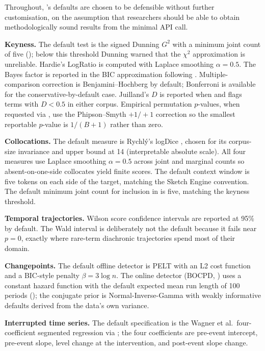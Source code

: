 \documentclass[codesnippet]{jss}
\newcommand{\fct}[1]{\code{#1()}}
\begin{document}
Throughout, 's defaults are chosen to be
defensible without further customisation, on the assumption that
researchers should be able to obtain methodologically sound
results from the minimal API call.

\textbf{Keyness.} The default test is the signed Dunning $G^2$
\citep{dunning1993} with a minimum joint count of five
(); below this threshold Dunning warned that
the $\chi^2$ approximation is unreliable. Hardie's LogRatio
\citep{hardie2014logratio} is computed with Laplace smoothing
$\alpha = 0.5$. The Bayes factor is reported in the BIC
approximation following \citet{wilson2013}. Multiple-comparison
correction is Benjamini--Hochberg \citep{benjamini1995fdr} by
default; Bonferroni is available for the conservative-by-default
case. Juilland's $D$ \citep{juilland1964} is reported when
 and flags terms with $D < 0.5$ in either
corpus. Empirical permutation $p$-values, when requested via
, use the Phipson--Smyth
\citep{phipson2010permutation} $+1/+1$ correction so the smallest
reportable $p$-value is $1/(B + 1)$ rather than zero.

\textbf{Collocations.} The default measure is Rychl\'y's logDice
\citep{rychly2008}, chosen for its corpus-size invariance and
upper bound at 14 (interpretable absolute scale). All four
measures use Laplace smoothing $\alpha = 0.5$ across joint and
marginal counts so absent-on-one-side collocates yield finite
scores. The default context window is five tokens on each side
of the target, matching the Sketch Engine convention. The
default minimum joint count for inclusion in
\fct{collocation\_shift} is five, matching the keyness threshold.

\textbf{Temporal trajectories.} Wilson score confidence intervals
\citep{wilson1927,newcombe1998} are reported at 95\% by default.
The Wald interval is deliberately not the default because it
fails near $p = 0$, exactly where rare-term diachronic
trajectories spend most of their domain.

\textbf{Changepoints.} The default offline detector is PELT
\citep{killick2012pelt} with an L2 cost function and a BIC-style
penalty $\beta = 3 \log n$. The online detector (BOCPD,
\citealt{adams2007bocpd}) uses a constant hazard function with
the default expected mean run length of 100 periods
(); the conjugate prior is
Normal-Inverse-Gamma with weakly informative defaults derived
from the data's own variance.

\textbf{Interrupted time series.} The default specification is
the Wagner et al.\ four-coefficient segmented regression
\citep{wagner2002its} via ; the four
coefficients are pre-event intercept, pre-event slope, level
change at the intervention, and post-event slope change.
\end{document}
